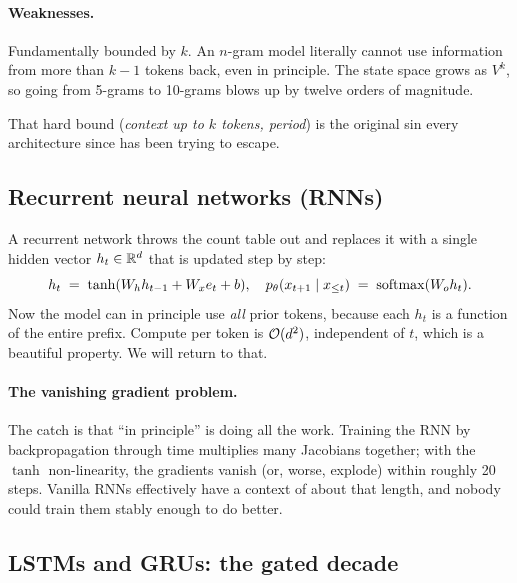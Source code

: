 \paragraph{Weaknesses.} Fundamentally bounded by \(k\). An \(n\)-gram model
literally cannot use information from more than \(k - 1\) tokens back, even
in principle. The state space grows as \(V^k\), so going from 5-grams to
10-grams blows up by twelve orders of magnitude.

That hard bound (\emph{context up to \(k\) tokens, period}) is the original
sin every architecture since has been trying to escape.

\subsection{Recurrent neural networks (RNNs)}

A recurrent network throws the count table out and replaces it with a single
hidden vector \(h_t \in \mathbb{R}^{d}\) that is updated step by step:
\begin{equation}
  h_t \;=\; \tanh(W_h h_{t-1} + W_x e_t + b),
  \quad
  p_\theta(x_{t+1} \mid x_{\le t}) \;=\; \operatorname{softmax}(W_o h_t).
  \label{eq:rnn}
\end{equation}
Now the model can in principle use \emph{all} prior tokens, because each
\(h_t\) is a function of the entire prefix. Compute per token is \(\mathcal{O}(d^2)\), independent
of \(t\), which is a beautiful property. We will return to that.

\paragraph{The vanishing gradient problem.} The catch is that ``in
principle'' is doing all the work. Training the RNN by backpropagation
through time multiplies many Jacobians together; with the \(\tanh\)
non-linearity, the gradients vanish (or, worse, explode) within roughly
20 steps. Vanilla RNNs effectively have a context of about that length, and
nobody could train them stably enough to do better.

\subsection{LSTMs and GRUs: the gated decade}

